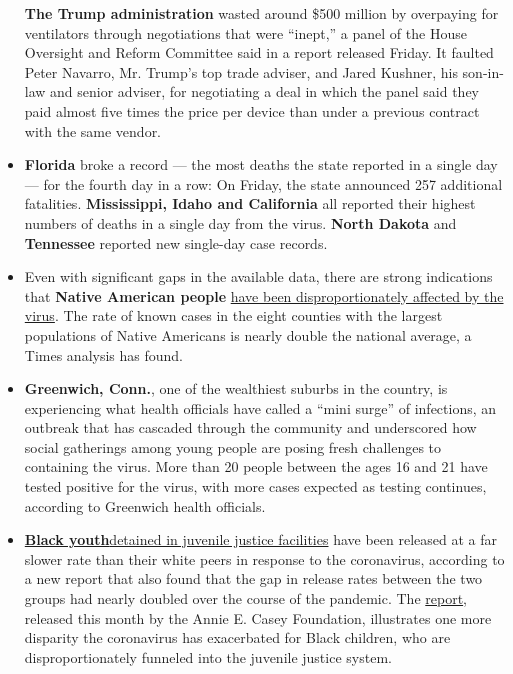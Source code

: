 \begin{itemize}
  \textbf{The Trump administration} wasted around \$500 million by
  overpaying for ventilators through negotiations that were ``inept,'' a
  panel of the House Oversight and Reform Committee said in a report
  released Friday. It faulted Peter Navarro, Mr. Trump's top trade
  adviser, and Jared Kushner, his son-in-law and senior adviser, for
  negotiating a deal in which the panel said they paid almost five times
  the price per device than under a previous contract with the same
  vendor.
\item
  \textbf{Florida} broke a record --- the most deaths the state reported
  in a single day --- for the fourth day in a row: On Friday, the state
  announced 257 additional fatalities. \textbf{Mississippi, Idaho and
  California} all reported their highest numbers of deaths in a single
  day from the virus. \textbf{North Dakota} and \textbf{Tennessee}
  reported new single-day case records.
\item
  Even with significant gaps in the available data, there are strong
  indications that \textbf{Native American people}
  \href{https://www.nytimes.com/2020/07/30/us/native-americans-coronavirus-data.html}{have
  been disproportionately affected by the virus}. The rate of known
  cases in the eight counties with the largest populations of Native
  Americans is nearly double the national average, a Times analysis has
  found.
\item
  \textbf{Greenwich, Conn.}, one of the wealthiest suburbs in the
  country, is experiencing what health officials have called a ``mini
  surge'' of infections, an outbreak that has cascaded through the
  community and underscored how social gatherings among young people are
  posing fresh challenges to containing the virus. More than 20 people
  between the ages 16 and 21 have tested positive for the virus, with
  more cases expected as testing continues, according to Greenwich
  health officials.
\item
  \textbf{\href{https://www.nytimes.com/2020/07/30/us/politics/juvenile-detainees-coronavirus.html}{Black
  youth}}\href{https://www.nytimes.com/2020/07/30/us/politics/juvenile-detainees-coronavirus.html}{detained
  in juvenile justice facilities} have been released at a far slower
  rate than their white peers in response to the coronavirus, according
  to a new report that also found that the gap in release rates between
  the two groups had nearly doubled over the course of the pandemic. The
  \href{https://www.aecf.org/blog/youth-detention-admissions-remain-low-but-releases-stall-despite-covid-19/}{report},
  released this month by the Annie E. Casey Foundation, illustrates one
  more disparity the coronavirus has exacerbated for Black children, who
  are disproportionately funneled into the juvenile justice system.
\end{itemize}


